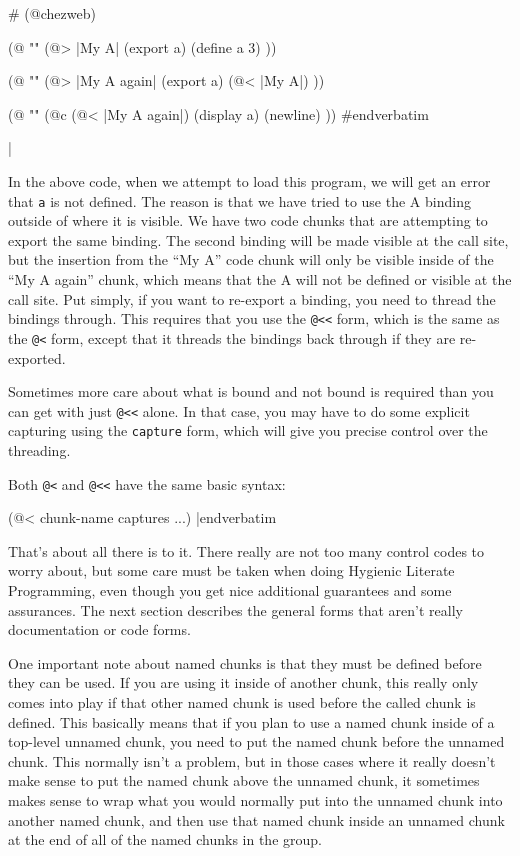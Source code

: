 \verbatimescapechar \#
\medskip\verbatim
(@chezweb)

(@ ""
(@> |My A| (export a)
(define a 3)
))

(@ ""
(@> |My A again| (export a)
(@< |My A|)
))

(@ ""
(@c
(@< |My A again|)
(display a) (newline)
))
#endverbatim
\medskip

\verbatimescapechar |

\noindent
In the above code, when we attempt to load this program, we will get
an error that {\tt a} is not defined.  The reason is that we have tried
to use the A binding outside of where it is visible.  We have two code
chunks that are attempting to export the same binding.  The second
binding will be made visible at the call site, but the insertion from
the ``My A'' code chunk will only be visible inside of the ``My A
again'' chunk, which means that the A will not be defined or visible
at the call site.  Put simply, if you want to re-export a binding, you
need to thread the bindings through.  This requires that you use the
{\tt @<<} form, which is the same as the {\tt @<} form, except that it
threads the bindings back through if they are re-exported.

Sometimes more care about what is bound and not bound is required than
you can get with just {\tt @<<} alone.  In that case, you may have to
do some explicit capturing using the {\tt capture} form, which will
give you precise control over the threading.

Both {\tt @<} and {\tt @<<} have the same basic syntax:

\medskip\verbatim
(@< chunk-name captures ...)
|endverbatim
\medskip

\noindent
That's about all there is to it.  There really are not too many
control codes to worry about, but some care must be taken when doing
Hygienic Literate Programming, even though you get nice additional
guarantees and some assurances.  The next section describes the
general forms that aren't really documentation or code forms.

One important note about named chunks is that they must be defined
before they can be used.  If you are using it inside of another chunk,
this really only comes into play if that other named chunk is used
before the called chunk is defined.  This basically means that if you
plan to use a named chunk inside of a top-level unnamed chunk, you
need to put the named chunk before the unnamed chunk.  This normally
isn't a problem, but in those cases where it really doesn't make sense
to put the named chunk above the unnamed chunk, it sometimes makes
sense to wrap what you would normally put into the unnamed chunk into
another named chunk, and then use that named chunk inside an unnamed
chunk at the end of all of the named chunks in the group.

